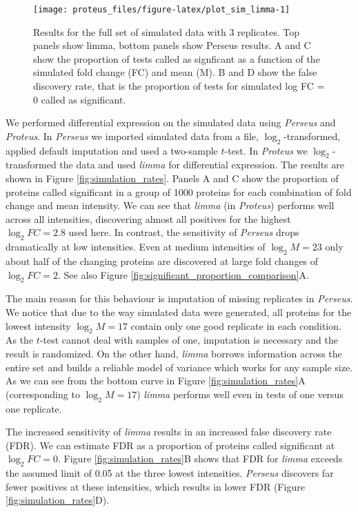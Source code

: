 \documentclass[]{article}
\begin{document}
\begin{figure}[H]

{\centering \texttt{[image: proteus\_files/figure-latex/plot\_sim\_limma-1]} 

}

\caption{\label{fig:simulation_rates}Results for the full set of simulated data with 3 replicates. Top panels show limma, bottom panels show Perseus results. A and C show the proportion of tests called as signficant as a function of the simulated fold change (FC) and mean (M). B and D show the false discovery rate, that is the proportion of tests for simulated log FC = 0 called as significant.}\label{fig:plot_sim_limma}
\end{figure}

We performed differential expression on the simulated data using
\emph{Perseus} and \emph{Proteus}. In \emph{Perseus} we imported
simulated data from a file, \(\log_2\)-transformed, applied default
imputation and used a two-sample \(t\)-test. In \emph{Proteus} we
\(\log_2\)-transformed the data and used \emph{limma} for differential
expression. The results are shown in Figure \ref{fig:simulation_rates}.
Panels A and C show the proportion of proteins called significant in a
group of 1000 proteins for each combination of fold change and mean
intensity. We can see that \emph{limma} (in \emph{Proteus}) performs
well across all intensities, discovering almost all positives for the
highest \(\log_2 FC = 2.8\) used here. In contrast, the sensitivity of
\emph{Perseus} drops dramatically at low intensities. Even at medium
intensities of \(\log_2 M = 23\) only about half of the changing
proteins are discovered at large fold changes of \(\log_2 FC = 2\). See
also Figure \ref{fig:significant_proportion_comparison}A.

The main reason for this behaviour is imputation of missing replicates
in \emph{Perseus}. We notice that due to the way simulated data were
generated, all proteins for the lowest intensity \(\log_2 M = 17\)
contain only one good replicate in each condition. As the \(t\)-test
cannot deal with samples of one, imputation is necessary and the result
is randomized. On the other hand, \emph{limma} borrows information
across the entire set and builds a reliable model of variance which
works for any sample size. As we can see from the bottom curve in Figure
\ref{fig:simulation_rates}A (corresponding to \(\log_2 M = 17\))
\emph{limma} performs well even in tests of one versus one replicate.

The increased sensitivity of \emph{limma} results in an increased false
discovery rate (FDR). We can estimate FDR as a proportion of proteins
called significant at \(\log_2 FC = 0\). Figure
\ref{fig:simulation_rates}B shows that FDR for \emph{limma} exceeds the
assumed limit of 0.05 at the three lowest intensities. \emph{Perseus}
discovers far fewer positives at these intensities, which results in
lower FDR (Figure \ref{fig:simulation_rates}D).
\end{document}
